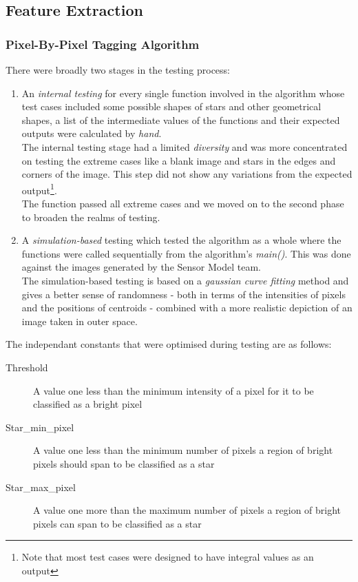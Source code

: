 \documentclass[../../main.tex]{subfiles}
\begin{document}
\subsection{Feature Extraction}
\subsubsection{Pixel-By-Pixel Tagging Algorithm}
		There were broadly two stages in the testing process:
		\begin{enumerate}
			\item An \emph{internal testing} for every single function involved in the algorithm whose test cases included some possible shapes of stars and other geometrical shapes, a list of the intermediate values of the functions and their expected outputs were calculated by \textit{hand}. \\
			The internal testing stage had a limited \textit{diversity} and was more concentrated on testing the extreme cases like a blank image and stars in the edges and corners of the image. This step did not show any variations from the expected output\footnote{Note that most test cases were designed to have integral values as an output}. \\
			The function passed all extreme cases and we moved on to the second phase to broaden the realms of testing.
			\item A \emph{simulation-based} testing which tested the algorithm as a whole where the functions were called sequentially from the algorithm's \textit{main()}. This was done against the images generated by the Sensor Model team. \\
			The simulation-based testing is based on a \textit{gaussian curve fitting} method and gives a better sense of randomness - both in terms of the intensities of pixels and the positions of centroids - combined with a more realistic depiction of an image taken in outer space. 
		\end{enumerate}

		The independant constants that were optimised during testing are as follows:
		\begin{description}
			\item [Threshold] A value one less than the minimum intensity of a pixel for it to be classified as a bright pixel
			\item [Star\_min\_pixel] A value one less than the minimum number of pixels a region of bright pixels should span to be classified as a star
			\item [Star\_max\_pixel] A value one more than the maximum number of pixels a region of bright pixels can span to be classified as a star
		\end{description}
\end{document}
